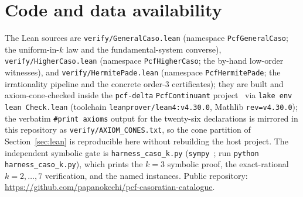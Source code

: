 \documentclass[11pt]{article}
\begin{document}
\section{Code and data availability}\label{sec:code}

\begin{sloppypar}
The Lean sources are \texttt{verify/GeneralCaso.lean} (namespace
\texttt{PcfGeneralCaso}; the uniform-in-$k$ law and the fundamental-system converse),
\texttt{verify/HigherCaso.lean} (namespace \texttt{PcfHigherCaso}; the by-hand
low-order witnesses), and \texttt{verify/HermitePade.lean} (namespace
\texttt{PcfHermitePade}; the irrationality pipeline and the concrete order-$3$
certificates); they are built and axiom-cone-checked inside the
\texttt{pcf-delta} \texttt{PcfContinuant} project~\cite{pcfdelta} via
\texttt{lake env lean Check.lean} (toolchain \texttt{leanprover/lean4:v4.30.0},
Mathlib \texttt{rev=v4.30.0}); the verbatim \texttt{\#print axioms} output for the
twenty-six declarations is mirrored in this repository as
\texttt{verify/AXIOM\_CONES.txt}, so the cone partition of Section~\ref{sec:lean} is
reproducible here without rebuilding the host project. The independent symbolic gate is
\texttt{harness\_caso\_k.py} (\texttt{sympy}~\cite{sympy}; run
\texttt{python harness\_caso\_k.py}), which prints the $k=3$ symbolic proof, the
exact-rational $k=2,\dots,7$ verification, and the named instances. Public repository:
\url{https://github.com/papanokechi/pcf-casoratian-catalogue}.
\end{sloppypar}
\end{document}
